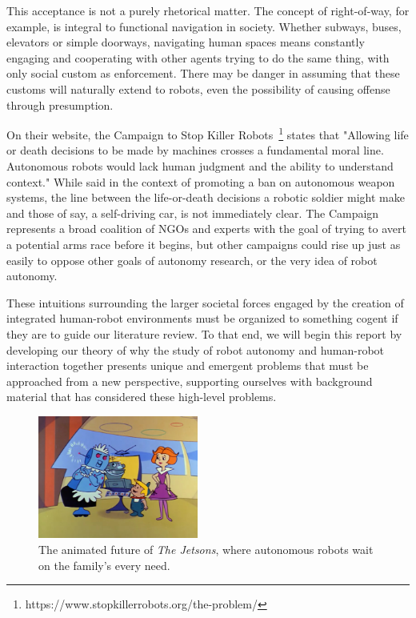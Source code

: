\documentclass{sfuthesis}
\begin{document}
This acceptance is not a purely rhetorical matter. The concept of right-of-way, for example, is integral to functional navigation in society. Whether subways, buses, elevators or simple doorways, navigating human spaces means constantly engaging and cooperating with other agents trying to do the same thing, with only social custom as enforcement. There may be danger in assuming that these customs will naturally extend to robots, even the possibility of causing offense through presumption.

On their website, the Campaign to Stop Killer Robots~\footnote{https://www.stopkillerrobots.org/the-problem/} states that "Allowing life or death decisions to be made by machines crosses a fundamental moral line. Autonomous robots would lack human judgment and the ability to understand context." While said in the context of promoting a ban on autonomous weapon systems, the line between the life-or-death decisions a robotic soldier might make and those of say, a self-driving car, is not immediately clear. The Campaign represents a broad coalition of NGOs and experts with the goal of trying to avert a potential arms race before it begins, but other campaigns could rise up just as easily to oppose other goals of autonomy research, or the very idea of robot autonomy.


These intuitions surrounding the larger societal forces engaged by the creation of integrated human-robot environments must be organized to something cogent if they are to guide our literature review. To that end, we will begin this report by developing our theory of why the study of robot autonomy and human-robot interaction together presents unique and emergent problems that must be approached from a new perspective, supporting ourselves with background material that has considered these high-level problems.

\begin{figure}
    \centering
    \includegraphics[width=0.47\textwidth]{jetsons.jpg} 

    \caption{The animated future of \textit{The Jetsons}, where autonomous robots wait on the family's every need.}
    \label{fig:jetsons}
\end{figure}
\end{document}
